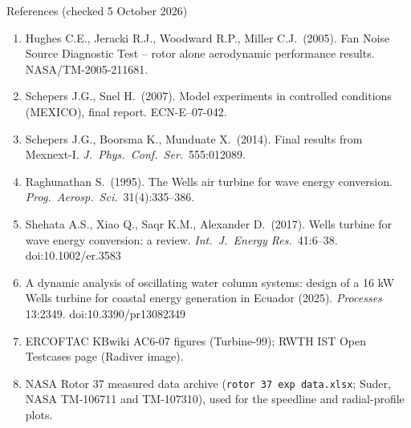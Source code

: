 \documentclass[aspectratio=169,10pt]{beamer}
\begin{document}
\begin{frame}[allowframebreaks]{References (checked 5 October 2026)}
\begin{enumerate}
\item Hughes C.E., Jeracki R.J., Woodward R.P., Miller C.J.\ (2005). Fan Noise Source Diagnostic Test -- rotor alone aerodynamic performance results. NASA/TM-2005-211681.
\item Schepers J.G., Snel H.\ (2007). Model experiments in controlled conditions (MEXICO), final report. ECN-E--07-042.
\item Schepers J.G., Boorsma K., Munduate X.\ (2014). Final results from Mexnext-I. \emph{J.\ Phys.\ Conf.\ Ser.}\ 555:012089.
\item Raghunathan S.\ (1995). The Wells air turbine for wave energy conversion. \emph{Prog.\ Aerosp.\ Sci.}\ 31(4):335--386.
\item Shehata A.S., Xiao Q., Saqr K.M., Alexander D.\ (2017). Wells turbine for wave energy conversion: a review. \emph{Int.\ J.\ Energy Res.}\ 41:6--38. doi:10.1002/er.3583
\item A dynamic analysis of oscillating water column systems: design of a 16 kW Wells turbine for coastal energy generation in Ecuador (2025). \emph{Processes} 13:2349. doi:10.3390/pr13082349
\item ERCOFTAC KBwiki AC6-07 figures (Turbine-99); RWTH IST Open Testcases page (Radiver image).
\item NASA Rotor 37 measured data archive (\texttt{rotor 37 exp data.xlsx}; Suder, NASA TM-106711 and TM-107310), used for the speedline and radial-profile plots.
\end{enumerate}
\end{frame}
\end{document}
